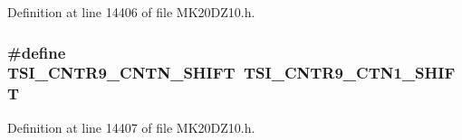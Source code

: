 Definition at line 14406 of file M\+K20\+D\+Z10.\+h.

\subsubsection[{\texorpdfstring{T\+S\+I\+\_\+\+C\+N\+T\+R9\+\_\+\+C\+N\+T\+N\+\_\+\+S\+H\+I\+FT}{TSI_CNTR9_CNTN_SHIFT}}]{\setlength{\rightskip}{0pt plus 5cm}\#define T\+S\+I\+\_\+\+C\+N\+T\+R9\+\_\+\+C\+N\+T\+N\+\_\+\+S\+H\+I\+FT~{\bf T\+S\+I\+\_\+\+C\+N\+T\+R9\+\_\+\+C\+T\+N1\+\_\+\+S\+H\+I\+FT}}\hypertarget{group___backward___compatibility___symbols_gaff005023621cb78239e344395b4b5925}{}\label{group___backward___compatibility___symbols_gaff005023621cb78239e344395b4b5925}


Definition at line 14407 of file M\+K20\+D\+Z10.\+h.

